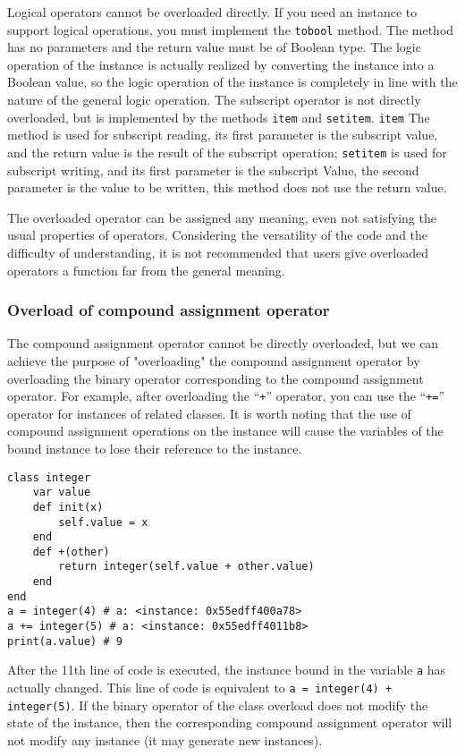 Logical operators cannot be overloaded directly. If you need an instance to support logical operations, you must implement the \texttt{tobool} method. The method has no parameters and the return value must be of Boolean type. The logic operation of the instance is actually realized by converting the instance into a Boolean value, so the logic operation of the instance is completely in line with the nature of the general logic operation. The subscript operator is not directly overloaded, but is implemented by the methods \texttt{item} and \texttt{setitem}. \texttt{item} The method is used for subscript reading, its first parameter is the subscript value, and the return value is the result of the subscript operation; \texttt{setitem} is used for subscript writing, and its first parameter is the subscript Value, the second parameter is the value to be written, this method does not use the return value.

The overloaded operator can be assigned any meaning, even not satisfying the usual properties of operators. Considering the versatility of the code and the difficulty of understanding, it is not recommended that users give overloaded operators a function far from the general meaning.

\subsubsection {Overload of compound assignment operator}

The compound assignment operator cannot be directly overloaded, but we can achieve the purpose of "overloading" the compound assignment operator by overloading the binary operator corresponding to the compound assignment operator. For example, after overloading the ``\texttt{+}'' operator, you can use the ``\texttt{+=}'' operator for instances of related classes. It is worth noting that the use of compound assignment operations on the instance will cause the variables of the bound instance to lose their reference to the instance.
\begin{lstlisting}[language=berry]
class integer
    var value
    def init(x)
        self.value = x
    end
    def +(other)
        return integer(self.value + other.value)
    end
end
a = integer(4) # a: <instance: 0x55edff400a78>
a += integer(5) # a: <instance: 0x55edff4011b8>
print(a.value) # 9
\end{lstlisting}After the 11th line of code is executed, the instance bound in the variable \texttt{a} has actually changed. This line of code is equivalent to \texttt{a = integer(4) + integer(5)}. If the binary operator of the class overload does not modify the state of the instance, then the corresponding compound assignment operator will not modify any instance (it may generate new instances).

